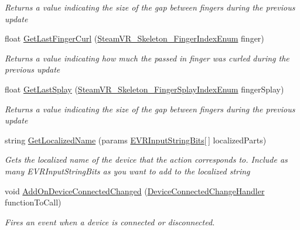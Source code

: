 \begin{DoxyCompactItemize}
\begin{DoxyCompactList}\small\item\em Returns a value indicating the size of the gap between fingers during the previous update \end{DoxyCompactList}\item 
float \mbox{\hyperlink{class_valve_1_1_v_r_1_1_steam_v_r___action___skeleton_a6cd3206d20f4e547f1477281341df8b9}{Get\+Last\+Finger\+Curl}} (\mbox{\hyperlink{namespace_valve_1_1_v_r_ac40c4bdf0a3dcd6e69cad2d85f287c67}{Steam\+V\+R\+\_\+\+Skeleton\+\_\+\+Finger\+Index\+Enum}} finger)
\begin{DoxyCompactList}\small\item\em Returns a value indicating how much the passed in finger was curled during the previous update \end{DoxyCompactList}\item 
float \mbox{\hyperlink{class_valve_1_1_v_r_1_1_steam_v_r___action___skeleton_a1c0f4446ac1ae1fdaebc267dbe49bba9}{Get\+Last\+Splay}} (\mbox{\hyperlink{namespace_valve_1_1_v_r_a43c97e13fe46f0575986b9f74945e0bf}{Steam\+V\+R\+\_\+\+Skeleton\+\_\+\+Finger\+Splay\+Index\+Enum}} finger\+Splay)
\begin{DoxyCompactList}\small\item\em Returns a value indicating the size of the gap between fingers during the previous update \end{DoxyCompactList}\item 
string \mbox{\hyperlink{class_valve_1_1_v_r_1_1_steam_v_r___action___skeleton_a398ec0f09d88b3047166425dcf8cb33c}{Get\+Localized\+Name}} (params \mbox{\hyperlink{namespace_valve_1_1_v_r_a05e76187bbc5846b9bfb44f6acf13912}{E\+V\+R\+Input\+String\+Bits}}\mbox{[}$\,$\mbox{]} localized\+Parts)
\begin{DoxyCompactList}\small\item\em Gets the localized name of the device that the action corresponds to. Include as many E\+V\+R\+Input\+String\+Bits as you want to add to the localized string \end{DoxyCompactList}\item 
void \mbox{\hyperlink{class_valve_1_1_v_r_1_1_steam_v_r___action___skeleton_ab0eb571e713112bf6695f2a322980522}{Add\+On\+Device\+Connected\+Changed}} (\mbox{\hyperlink{class_valve_1_1_v_r_1_1_steam_v_r___action___skeleton_a737d68e8f67790bf838b4f5bac3ffae1}{Device\+Connected\+Change\+Handler}} function\+To\+Call)
\begin{DoxyCompactList}\small\item\em Fires an event when a device is connected or disconnected. \end{DoxyCompactList}\item 

\end{DoxyCompactItemize}
